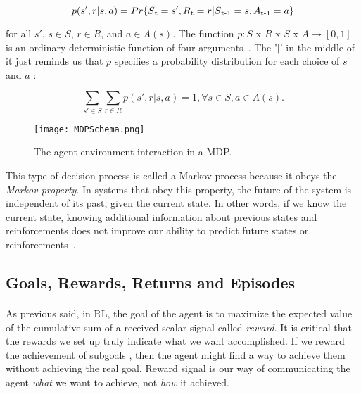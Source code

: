 \begin{equation}
p(s', r | s, a) = Pr\{S\textsubscript{t} = s', R\textsubscript{t} = r | S\textsubscript{t-1} = s, A\textsubscript{t-1} = a\}
\end{equation}

for all $s'$, $s \in S$, $r \in R$, and $a \in A(s)$. The function $p : S$ x $R$ x $S$ x $A \longrightarrow [0, 1]$ is an ordinary deterministic function of four arguments~\cite{SuttonBarto}. The '$\mid$' in the middle of it just reminds us that $p$ specifies a probability distribution for each choice of $s$ and $a$ :

\begin{equation}
  \sum_{s'\in S} \sum_{r\in R} p(s', r | s, a) = 1,  \forall s \in S, a \in A(s). 
\end{equation}

\begin{center}

  \begin{figure}[h!]
  \texttt{[image: MDPSchema.png]}
    \caption{The agent-environment interaction in a MDP.}
    \label{fig:MDPS}
  \end{figure}
  
\end{center}

This type of decision process is called a Markov process because it obeys the \textit{Markov property}. In systems that obey this property, the future of the system is independent of its past, given the current state. In other words, if we know the current state, knowing additional information about previous states and reinforcements does not improve our ability to predict future states or reinforcements~\cite{Maia2009}.


\subsection{Goals, Rewards, Returns and Episodes}
\paragraph{} As previous said, in RL, the goal of the agent is to maximize the expected value of the cumulative sum of a received scalar signal called \textit{reward}. It is critical that the rewards we set up truly indicate what we want accomplished. If we reward the achievement of subgoals , then the agent might find a way to achieve them without achieving the real goal. Reward signal is our way of communicating the agent \textit{what} we want to achieve, not \textit{how} it achieved. 

